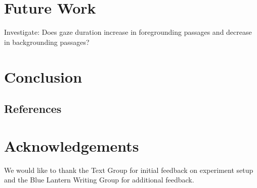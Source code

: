 \documentclass[11pt]{article}
\begin{document}
\section{Future Work}


Investigate: Does gaze duration increase in foregrounding passages and decrease in backgrounding passages?

\section{Conclusion}


\subsection{References}

\nocite{Green2004,liwc_22,kuzmicova2014,brysbaert2014,Maslej2019TheTF,green_brock_kaufman_2006,Consoli2018,busselle2009,jacobs2018,jacobs2017,stockwell2002cognitive,HSU201596,willems_2015,mak2019,kunze2015,ferreira-goncalo-oliveira-2018-seeking,aryani2013,delatorre2019,andrade2020,indico2015,gerrig_1993,Magyari2020}





\section*{Acknowledgements}

We would like to thank the Text Group for initial feedback on experiment setup and the Blue Lantern Writing Group for additional feedback.
\end{document}
